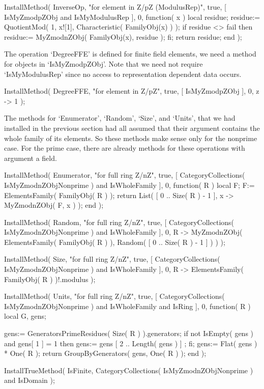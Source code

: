 InstallMethod( InverseOp,
    "for element in Z/pZ (ModulusRep)",
    true,
    [ IsMyZmodpZObj and IsMyModulusRep ], 0,
    function( x )
    local residue;
    residue:= QuotientMod( 1, x![1], Characteristic( FamilyObj(x) ) );
    if residue <> fail then
      residue:= MyZmodnZObj( FamilyObj(x), residue );
    fi;
    return residue;
    end );
\endtt

The operation `DegreeFFE' is defined for finite field elements,
we need a method for objects in `IsMyZmodpZObj'.
Note that we need not require `IsMyModulusRep' since no access to
representation dependent data occurs.

\begintt
InstallMethod( DegreeFFE,
    "for element in Z/pZ",
    true,
    [ IsMyZmodpZObj ], 0,
    z -> 1 );
\endtt

The methods for `Enumerator', `Random', `Size', and `Units',
that we had installed in the previous section had all assumed that
their argument contains the whole family of its elements.
So these methods make sense only for the nonprime case.
For the prime case, there are already methods for these operations
with argument a field.

\begintt
InstallMethod( Enumerator,
    "for full ring Z/nZ",
    true,
    [ CategoryCollections( IsMyZmodnZObjNonprime ) and IsWholeFamily ],
    0,
    function( R )
    local F;
    F:= ElementsFamily( FamilyObj( R ) );
    return List( [ 0 .. Size( R ) - 1 ], x -> MyZmodnZObj( F, x ) );
    end );

InstallMethod( Random,
    "for full ring Z/nZ",
    true,
    [ CategoryCollections( IsMyZmodnZObjNonprime ) and IsWholeFamily ],
    0,
    R -> MyZmodnZObj( ElementsFamily( FamilyObj( R ) ),
                    Random( [ 0 .. Size( R ) - 1 ] ) ) );

InstallMethod( Size,
    "for full ring Z/nZ",
    true,
    [ CategoryCollections( IsMyZmodnZObjNonprime ) and IsWholeFamily ],
    0,
    R -> ElementsFamily( FamilyObj( R ) )!.modulus );

InstallMethod( Units,
    "for full ring Z/nZ",
    true,
    [     CategoryCollections( IsMyZmodnZObjNonprime )
      and IsWholeFamily and IsRing ], 0,
    function( R )
    local G, gens;

    gens:= GeneratorsPrimeResidues( Size( R ) ).generators;
    if not IsEmpty( gens ) and gens[ 1 ] = 1 then
      gens:= gens{ [ 2 .. Length( gens ) ] };
    fi;
    gens:= Flat( gens ) * One( R );
    return GroupByGenerators( gens, One( R ) );
    end );

InstallTrueMethod( IsFinite,
    CategoryCollections( IsMyZmodnZObjNonprime ) and IsDomain );
\endtt



